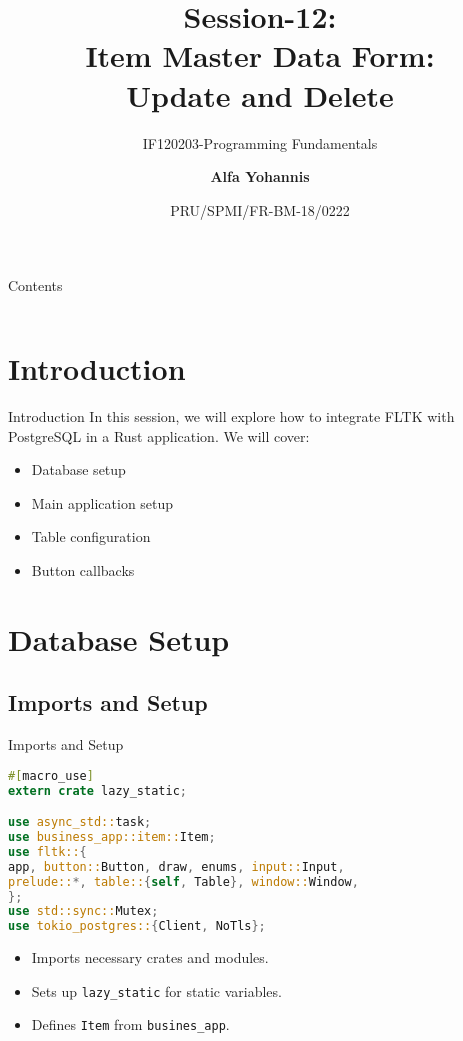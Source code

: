 \documentclass[aspectratio=169, table]{beamer}
\subtitle{IF120203-Programming Fundamentals}
\title{Session-12:\\\LARGE{Item Master Data Form:\\Update and Delete}}
\date[Serial]{\scriptsize {PRU/SPMI/FR-BM-18/0222}}
\author[Pradita]{\small{\textbf{Alfa Yohannis}}}
\begin{document}
\frame{\titlepage}

\begin{frame}{Contents}
\vspace{15pt}
\begin{columns}[t]
\begin{column}{.5\textwidth}
\tableofcontents[sections={1-3}]
\end{column}
\begin{column}{.5\textwidth}
\tableofcontents[sections={4-6}]
\end{column}
\end{columns}
\end{frame}


\section{Introduction}
\begin{frame}{Introduction}
In this session, we will explore how to integrate FLTK with PostgreSQL in a Rust application. We will cover:
\begin{itemize}
\item Database setup
\item Main application setup
\item Table configuration
\item Button callbacks
\end{itemize}
\end{frame}

\section{Database Setup}
\subsection{Imports and Setup}
\begin{frame}[fragile]{Imports and Setup}
\vspace{15pt}
\begin{lstlisting}[language=Rust]
#[macro_use]
extern crate lazy_static;

use async_std::task;
use business_app::item::Item;
use fltk::{
app, button::Button, draw, enums, input::Input,
prelude::*, table::{self, Table}, window::Window,
};
use std::sync::Mutex;
use tokio_postgres::{Client, NoTls};
\end{lstlisting}

\begin{itemize}
\item Imports necessary crates and modules.
\item Sets up \texttt{lazy\_static} for static variables.
\item Defines \texttt{Item} from \texttt{busines\_app}.
\end{itemize}
\end{frame}
\end{document}
